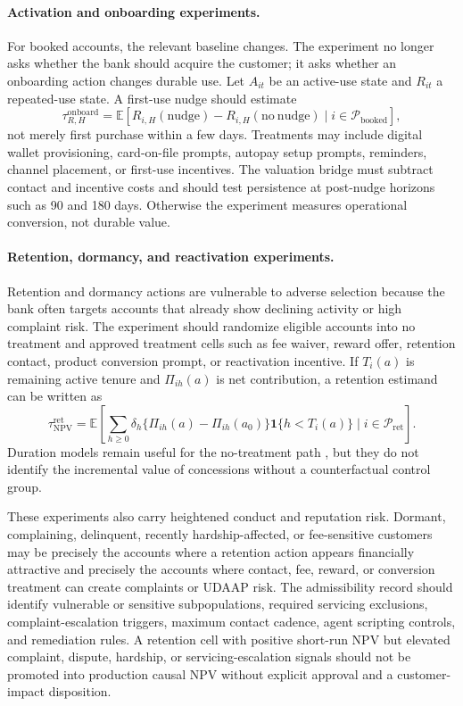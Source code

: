 \documentclass[11pt]{article}
\newcommand{\E}{\mathbb{E}}
\newcommand{\NPV}{\mathrm{NPV}}
\newcommand{\1}{\mathbf{1}}
\begin{document}
\paragraph{Activation and onboarding experiments.}
For booked accounts, the relevant baseline changes. The experiment no longer
asks whether the bank should acquire the customer; it asks whether an
onboarding action changes durable use. Let $A_{it}$ be an active-use state and
$R_{it}$ a repeated-use state. A first-use nudge should estimate
\begin{equation}
  \tau^{\mathrm{onboard}}_{R,H}
  =
  \E[R_{i,H}(\mathrm{nudge})-R_{i,H}(\mathrm{no\ nudge})
  \mid i\in\mathcal{P}_{\mathrm{booked}}],
  \label{eq:onboarding-repeated-use}
\end{equation}
not merely first purchase within a few days. Treatments may include digital
wallet provisioning, card-on-file prompts, autopay setup prompts, reminders,
channel placement, or first-use incentives. The valuation bridge must subtract
contact and incentive costs and should test persistence at post-nudge horizons
such as 90 and 180 days. Otherwise the experiment measures operational
conversion, not durable value.

\paragraph{Retention, dormancy, and reactivation experiments.}
Retention and dormancy actions are vulnerable to adverse selection because the
bank often targets accounts that already show declining activity or high
complaint risk. The experiment should randomize eligible accounts into no
treatment and approved treatment cells such as fee waiver, reward offer,
retention contact, product conversion prompt, or reactivation incentive. If
$T_i(a)$ is remaining active tenure and $\Pi_{ih}(a)$ is net contribution, a
retention estimand can be written as
\begin{equation}
  \tau^{\mathrm{ret}}_{\NPV}
  =
  \E\!\left[
    \sum_{h\ge 0}\delta_h
    \{\Pi_{ih}(a)-\Pi_{ih}(a_0)\}\1\{h<T_i(a)\}
    \mid i\in\mathcal{P}_{\mathrm{ret}}
  \right].
  \label{eq:retention-npv-estimand}
\end{equation}
Duration models remain useful for the no-treatment path
\citep{schmittlein1987counting,fader2005bgnbd,bolton1998duration}, but they
do not identify the incremental value of concessions without a counterfactual
control group.

These experiments also carry heightened conduct and reputation risk. Dormant,
complaining, delinquent, recently hardship-affected, or fee-sensitive customers
may be precisely the accounts where a retention action appears financially
attractive and precisely the accounts where contact, fee, reward, or
conversion treatment can create complaints or UDAAP risk. The admissibility
record should identify vulnerable or sensitive subpopulations, required
servicing exclusions, complaint-escalation triggers, maximum contact cadence,
agent scripting controls, and remediation rules. A retention cell with positive
short-run NPV but elevated complaint, dispute, hardship, or servicing-escalation
signals should not be promoted into production causal NPV without explicit
approval and a customer-impact disposition.
\end{document}
